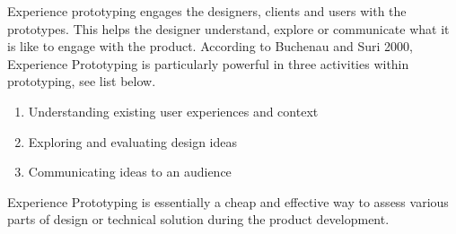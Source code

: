 Experience prototyping engages the designers, clients and users with the prototypes. This helps the designer understand, explore or communicate what it is like to engage with the product. According to Buchenau and Suri 2000, Experience Prototyping is particularly powerful in three activities within prototyping, see list below.

\vspace{0.5cm}
\begin{enumerate}
    \item Understanding existing user experiences and context
    \item Exploring and evaluating design ideas
    \item Communicating ideas to an audience
\end{enumerate}
\vspace{0.5cm}

Experience Prototyping is essentially a cheap and effective way to assess various parts of design or technical solution during the product development.\cite{christer}